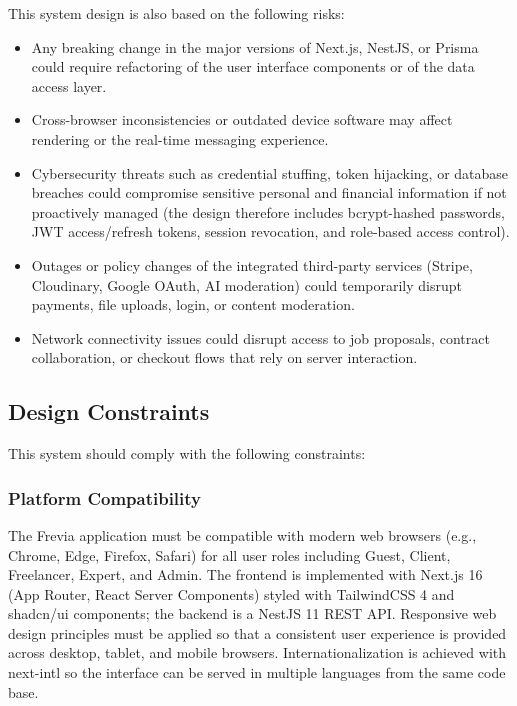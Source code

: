 This system design is also based on the following risks:
\begin{itemize}[leftmargin=*]
    \item Any breaking change in the major versions of Next.js, NestJS, or Prisma could require refactoring of the user interface components or of the data access layer.
    \item Cross-browser inconsistencies or outdated device software may affect rendering or the real-time messaging experience.
    \item Cybersecurity threats such as credential stuffing, token hijacking, or database breaches could compromise sensitive personal and financial information if not proactively managed (the design therefore includes bcrypt-hashed passwords, JWT access/refresh tokens, session revocation, and role-based access control).
    \item Outages or policy changes of the integrated third-party services (Stripe, Cloudinary, Google OAuth, AI moderation) could temporarily disrupt payments, file uploads, login, or content moderation.
    \item Network connectivity issues could disrupt access to job proposals, contract collaboration, or checkout flows that rely on server interaction.
\end{itemize}

\subsection{Design Constraints}

This system should comply with the following constraints:

\subsubsection{Platform Compatibility}

The Frevia application must be compatible with modern web browsers (e.g., Chrome, Edge, Firefox, Safari) for all user roles including Guest, Client, Freelancer, Expert, and Admin. The frontend is implemented with Next.js 16 (App Router, React Server Components) styled with TailwindCSS 4 and shadcn/ui components; the backend is a NestJS 11 REST API. Responsive web design principles must be applied so that a consistent user experience is provided across desktop, tablet, and mobile browsers. Internationalization is achieved with next-intl so the interface can be served in multiple languages from the same code base.


